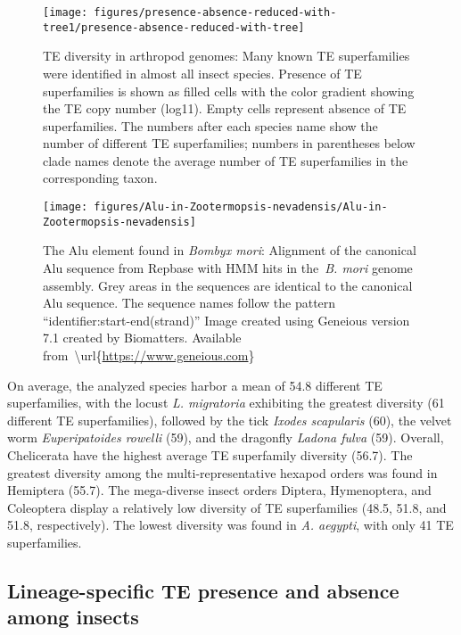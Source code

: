 \begin{figure}[h!]
\begin{center}
\texttt{[image: figures/presence-absence-reduced-with-tree1/presence-absence-reduced-with-tree]}
\caption[TE diversity in arthropod genomes]{{TE diversity in arthropod genomes: Many known TE superfamilies were
identified in almost all insect species. Presence of TE superfamilies is
shown as filled cells with the color gradient showing the TE copy number
(log11). Empty cells represent absence of TE superfamilies. The numbers
after each species name show the number of different TE superfamilies;
numbers in parentheses below clade names denote the average number of TE
superfamilies in the corresponding taxon.%
}}
\end{center}
\end{figure}

\begin{figure}[h!]
\begin{center}
\texttt{[image: figures/Alu-in-Zootermopsis-nevadensis/Alu-in-Zootermopsis-nevadensis]}
\caption[The Alu element found in \emph{Bombyx mori}]{{The Alu element
found in \emph{Bombyx mori}: Alignment of the canonical Alu sequence
from Repbase with HMM hits in the~\emph{B. mori} genome assembly. Grey
areas in the sequences are identical to the canonical Alu sequence. The
sequence names follow the pattern ``identifier:start-end(strand)'' Image
created using Geneious version 7.1 created by Biomatters. Available
from~\textbackslash{}url\{\url{https://www.geneious.com}\}
{\label{169157}}%
}}
\end{center}
\end{figure}

On average, the analyzed species harbor a mean of 54.8 different TE
superfamilies, with the locust \emph{L. migratoria} exhibiting the
greatest diversity (61 different TE superfamilies), followed by the tick
\emph{Ixodes scapularis} (60), the velvet worm \emph{Euperipatoides
rowelli} (59), and the dragonfly \emph{Ladona fulva} (59). Overall,
Chelicerata have the highest average TE superfamily diversity (56.7).
The greatest diversity among the multi-representative hexapod orders was
found in Hemiptera (55.7). The mega-diverse insect orders Diptera,
Hymenoptera, and Coleoptera display a relatively low diversity of TE
superfamilies (48.5, 51.8, and 51.8, respectively). The lowest diversity
was found in \emph{A. aegypti}, with only 41 TE superfamilies.

\subsection{Lineage-specific TE presence and absence among
insects}\label{lineage-specific-te-presence-and-absence-among-insects}

